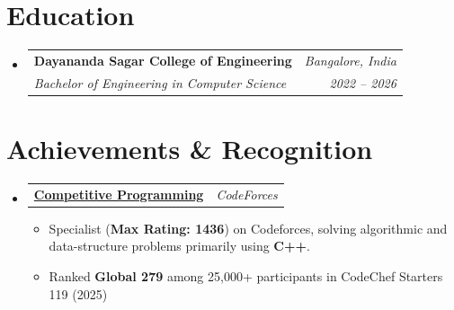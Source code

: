\documentclass[a4paper,12pt]{article}
\makeatletter
\newcommand{\resumeItem}[1]{
  \item\small{#1 \vspace{-2pt}}
}
\newcommand{\resumeSubheading}[4]{
  \vspace{-1pt}\item
    \begin{tabular*}{0.97\textwidth}[t]{l@{\extracolsep{\fill}}r}
      \textbf{\color{accentcolor}#1} & \textit{\small #2} \\
      \textit{\small#3} & \textit{\small #4} \\
    \end{tabular*}\vspace{-5pt}
}
\newcommand{\resumeProjectHeading}[2]{
    \item
    \begin{tabular*}{0.97\textwidth}{l@{\extracolsep{\fill}}r}
      \small\textbf{\color{accentcolor}#1} & \textit{\small #2}
    \end{tabular*}\vspace{-5pt}
}
\newcommand{\resumeSubHeadingListStart}{\begin{itemize}[leftmargin=0.15in, label={}]}
\newcommand{\resumeSubHeadingListEnd}{\end{itemize}}
\newcommand{\resumeItemListStart}{\begin{itemize}[leftmargin=0.15in]}
\newcommand{\resumeItemListEnd}{\end{itemize}\vspace{-5pt}}
\makeatother
\begin{document}
\section{Education}
  \resumeSubHeadingListStart
    \resumeSubheading
      {Dayananda Sagar College of Engineering}{Bangalore, India}
      {Bachelor of Engineering in Computer Science}{2022 -- 2026}
  \resumeSubHeadingListEnd

\section{Achievements \& Recognition}
  \resumeSubHeadingListStart
    \resumeProjectHeading
        {\href{https://codeforces.com/profile/visheshgautam.official}{Competitive Programming}}{CodeForces}
        \resumeItemListStart
          \resumeItem{Specialist (\textbf{Max Rating: 1436}) on Codeforces, solving algorithmic and data-structure problems primarily using \textbf{C++}.}
          \resumeItem{Ranked \textbf{Global 279} among 25,000+ participants in CodeChef Starters 119 (2025)}
        \resumeItemListEnd
  \resumeSubHeadingListEnd
\end{document}
